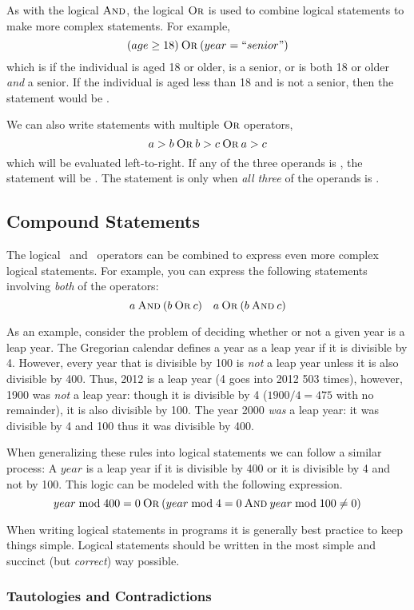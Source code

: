 As with the logical $\mathbin{\textsc{And}}$, the logical $\mathbin{\textsc{Or}}$ is used to combine logical statements
to make more complex statements.  For example, 
  $$(age \geq 18) \mathbin{\textsc{Or}} (year = ``senior")$$
which is \True if the individual is aged 18 or older, is a senior, or is both 18 or older \emph{and}
a senior.  If the individual is aged less than 18 and is not a senior, then the statement
would be \False.

We can also write statements with multiple $\mathbin{\textsc{Or}}$ operators, 
  $$a > b \mathbin{\textsc{Or}} b > c \mathbin{\textsc{Or}} a > c$$
which will be evaluated left-to-right.  If any of the three operands is \True, the 
statement will be \True.  The statement is only \False when \emph{all three} of the
operands is \False.

\subsection{Compound Statements}

The logical \And\ and \Or\ operators can be combined to express even more complex
logical statements.  For example, you can express the following statements involving
\emph{both} of the operators:
  $$a \mathbin{\textsc{And}} (b \mathbin{\textsc{Or}} c) \quad a \mathbin{\textsc{Or}} (b \mathbin{\textsc{And}} c)$$

As an example, consider the problem of deciding whether or not a given year
is a leap year.  The Gregorian calendar defines a year as a leap year if it is divisible 
by 4.  However, every year that is divisible by 100 is \emph{not} a leap year unless 
it is also divisible by 400.  Thus, 2012 is a leap year (4 goes into 2012 503 times), 
however, 1900 was \emph{not} a leap year: though it is divisible by 4 
($1900 / 4 = 475$ with no remainder), it is also divisible by 100.  The year 2000 
\emph{was} a leap year: it was divisible by 4 and 100 thus it was divisible by 400.

When generalizing these rules into logical statements we can follow a similar process:
A $year$ is a leap year if it is divisible by 400 or it is divisible by 4 and not by 100.  
This logic can be modeled with the following expression.
  $$year \bmod{400} = 0 \mathbin{\textsc{Or}} ( year \bmod{4} = 0 \mathbin{\textsc{And}} year \bmod{100} \neq 0)$$

When writing logical statements in programs it is generally best practice to 
keep things simple.  Logical statements should be written in the most simple and
succinct (but \emph{correct}) way possible.  

\subsubsection{Tautologies and Contradictions}

